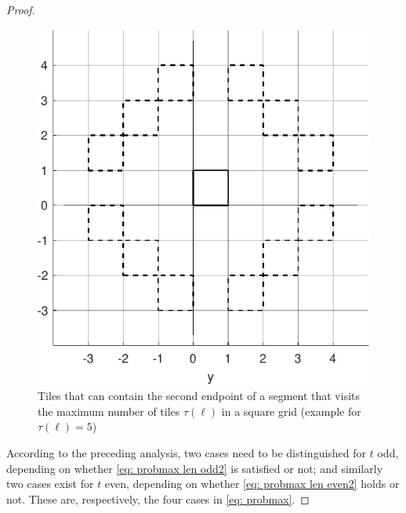 \documentclass[12pt, a4paper]{article}
\newcommand{\funt}{\tau} %
\newcommand{\len}{\ell} %
\newcommand{\tiles}{t} %
\begin{document}
\begin{proof}
\begin{figure}
\centering%
\includegraphics[width=.52\textwidth]{probmax_possible_tiles}%
\caption{Tiles that can contain the second endpoint of a segment that visits the maximum number of tiles $\funt(\len)$ in a square grid (example for $\funt(\len)=5$)%
}%
\label{fig: probmax_possible_tiles}%
\end{figure}%

According to the preceding analysis, two cases need to be distinguished for $\tiles$ odd, depending on whether \eqref{eq: probmax len odd2} is satisfied or not; and similarly two cases exist for $\tiles$ even, depending on whether \eqref{eq: probmax len even2} holds or not. These are, respectively, the four cases in \eqref{eq: probmax}.


\end{proof}
\end{document}
